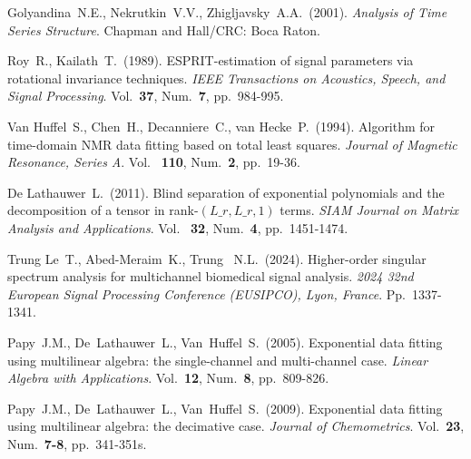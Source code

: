 \documentclass[12pt]{article}
\theoremstyle{definition}
\begin{document}
\begin{thebibliography}{10}

  Golyandina~N.E., Nekrutkin~V.V., Zhigljavsky~A.A.~(2001).
  {\sl Analysis of Time Series Structure}.
  Chapman and Hall/CRC: Boca Raton.

  Roy~R., Kailath~T.~(1989).
  ESPRIT-estimation of signal parameters via rotational invariance techniques.
  {\sl IEEE Transactions on Acoustics, Speech, and Signal Processing}.
  Vol.~{\bf 37}, Num.~{\bf 7},
  pp.~984-995.

  Van Huffel~S., Chen~H., Decanniere~C., van Hecke~P.~(1994).
  Algorithm for time-domain {NMR} data fitting based on total least
  squares. {\sl Journal of Magnetic Resonance, Series A}. Vol.~{\bf
  110}, Num.~{\bf 2},
  pp.~19-36.

  De Lathauwer~L.~(2011). Blind separation of exponential polynomials
  and the decomposition of a tensor in rank-$(L\_r,L\_r,1)$ terms.
  {\sl SIAM Journal on Matrix Analysis and Applications}. Vol.~{\bf
  32}, Num.~{\bf 4},
  pp.~1451-1474.

  Trung Le~T., Abed-Meraim~K., Trung ~N.L.~(2024). Higher-order
  singular spectrum analysis for multichannel biomedical signal
  analysis. {\sl 2024 32nd European Signal Processing Conference
  (EUSIPCO), Lyon, France}. Pp.~1337-1341.

  Papy~J.M., De~Lathauwer~L., Van~Huffel~S.~(2005).
  Exponential data fitting using multilinear algebra: the
  single-channel and multi-channel case.
  {\sl Linear Algebra with Applications}. Vol.~{\bf 12}, Num.~{\bf 8},
  pp.~809-826.

  Papy~J.M., De~Lathauwer~L., Van~Huffel~S.~(2009).
  Exponential data fitting using multilinear algebra: the decimative case.
  {\sl Journal of Chemometrics}. Vol.~{\bf 23}, Num.~{\bf 7-8},
  pp.~341-351s.


\end{thebibliography}
\end{document}
